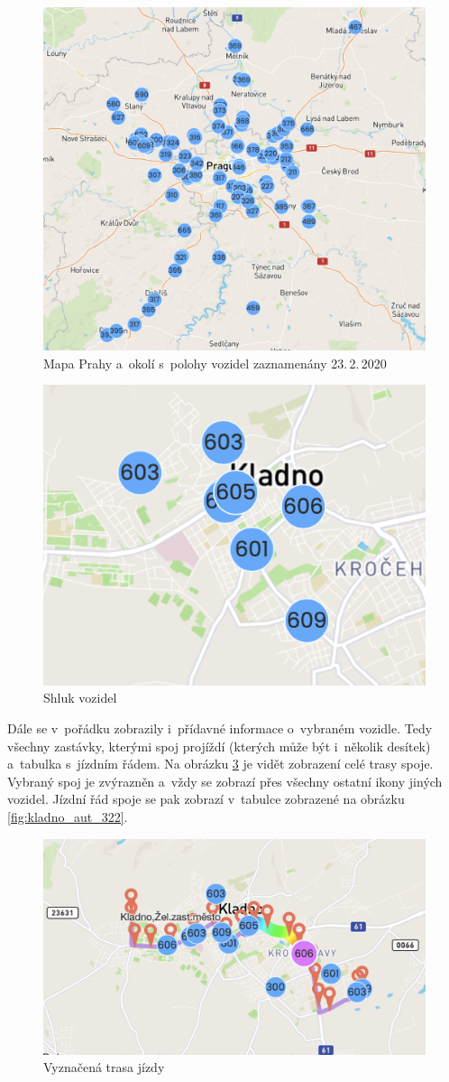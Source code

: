 \begin{figure}
   \centering
 \includegraphics[width=0.7\linewidth]{../img/big_picture.png}
 \caption{Mapa Prahy a~okolí s~polohy vozidel zaznamenány 23.\,2.\,2020}
 \label{fig:big_picture}
\end{figure}


\begin{figure}
   \centering
 \includegraphics[width=0.3\linewidth]{../img/cluster.png}
 \caption{Shluk vozidel}
 \label{fig:cluster}
\end{figure}


\bigbreak


Dále se v~pořádku zobrazily i~přídavné informace o~vybraném vozidle. Tedy všechny zastávky, kterými spoj projíždí (kterých může být i~několik desítek) a~tabulka s~jízdním řádem. Na obrázku \ref{fig:trip_path} je vidět zobrazení celé trasy spoje. Vybraný spoj je zvýrazněn a~vždy se zobrazí přes všechny ostatní ikony jiných vozidel. Jízdní řád spoje se pak zobrazí v~tabulce zobrazené na obrázku \ref{fig:kladno_aut_322}.


\begin{figure}
   \centering
 \includegraphics[width=0.7\linewidth]{../img/trip_path.png}
 \caption{Vyznačená trasa jízdy}
 \label{fig:trip_path}
\end{figure}


